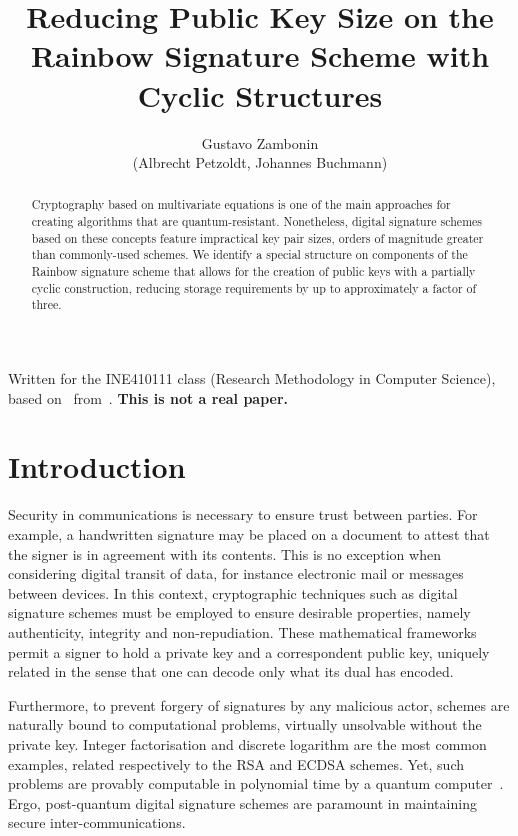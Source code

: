 \documentclass[a4paper, 14pt]{extarticle}
\title{Reducing Public Key Size on the Rainbow Signature Scheme with Cyclic Structures}
\author{Gustavo Zambonin\inst{1} \\ (Albrecht Petzoldt\inst{2}, Johannes Buchmann\inst{2})}
\begin{document}
 

\maketitle

\begin{abstract}
Cryptography based on multivariate equations is one of the main approaches for creating algorithms that are quantum-resistant. Nonetheless, digital signature schemes based on these concepts feature impractical key pair sizes, orders of magnitude greater than commonly-used schemes. We identify a special structure on components of the Rainbow signature scheme that allows for the creation of public keys with a partially cyclic construction, reducing storage requirements by up to approximately a factor of three.
\end{abstract}

Written for the INE410111 class (Research Methodology in Computer Science), based on~\cite{Petzoldt:inproc:2010:dec} from~\cite{Petzoldt:phd:2013:jul}. \textbf{This is not a real paper.}

\section{Introduction}\label{sec:intro}

Security in communications is necessary to ensure trust between parties. For example, a handwritten signature may be placed on a document to attest that the signer is in agreement with its contents. This is no exception when considering digital transit of data, for instance electronic mail or messages between devices. In this context, cryptographic techniques such as digital signature schemes must be employed to ensure desirable properties, namely authenticity, integrity and non-repudiation. These mathematical frameworks permit a signer to hold a private key and a correspondent public key, uniquely related in the sense that one can decode only what its dual has encoded. 

Furthermore, to prevent forgery of signatures by any malicious actor, schemes are naturally bound to computational problems, virtually unsolvable without the private key. Integer factorisation and discrete logarithm are the most common examples, related respectively to the RSA and ECDSA schemes. Yet, such problems are provably computable in polynomial time by a quantum computer~\cite{Shor:article:1997:oct}. Ergo, post-quantum digital signature schemes are paramount in maintaining secure inter-communications.
\end{document}
